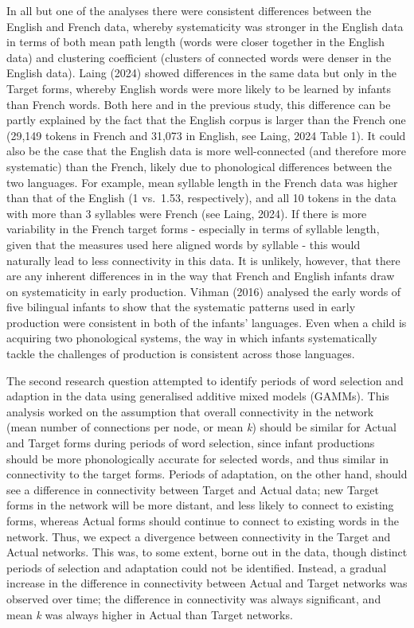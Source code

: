 \documentclass[
  man]{apa6}
\begin{document}
In all but one of the analyses there were consistent differences between the English and French data, whereby systematicity was stronger in the English data in terms of both mean path length (words were closer together in the English data) and clustering coefficient (clusters of connected words were denser in the English data). Laing (2024) showed differences in the same data but only in the Target forms, whereby English words were more likely to be learned by infants than French words. Both here and in the previous study, this difference can be partly explained by the fact that the English corpus is larger than the French one (29,149 tokens in French and 31,073 in English, see Laing, 2024 Table 1). It could also be the case that the English data is more well-connected (and therefore more systematic) than the French, likely due to phonological differences between the two languages. For example, mean syllable length in the French data was higher than that of the English (1 vs.~1.53, respectively), and all 10 tokens in the data with more than 3 syllables were French (see Laing, 2024). If there is more variability in the French target forms - especially in terms of syllable length, given that the measures used here aligned words by syllable - this would naturally lead to less connectivity in this data. It is unlikely, however, that there are any inherent differences in in the way that French and English infants draw on systematicity in early production. Vihman (2016) analysed the early words of five bilingual infants to show that the systematic patterns used in early production were consistent in both of the infants' languages. Even when a child is acquiring two phonological systems, the way in which infants systematically tackle the challenges of production is consistent across those languages.

The second research question attempted to identify periods of word selection and adaption in the data using generalised additive mixed models (GAMMs). This analysis worked on the assumption that overall connectivity in the network (mean number of connections per node, or mean \emph{k}) should be similar for Actual and Target forms during periods of word selection, since infant productions should be more phonologically accurate for selected words, and thus similar in connectivity to the target forms. Periods of adaptation, on the other hand, should see a difference in connectivity between Target and Actual data; new Target forms in the network will be more distant, and less likely to connect to existing forms, whereas Actual forms should continue to connect to existing words in the network. Thus, we expect a divergence between connectivity in the Target and Actual networks. This was, to some extent, borne out in the data, though distinct periods of selection and adaptation could not be identified. Instead, a gradual increase in the difference in connectivity between Actual and Target networks was observed over time; the difference in connectivity was always significant, and mean \emph{k} was always higher in Actual than Target networks.
\end{document}

